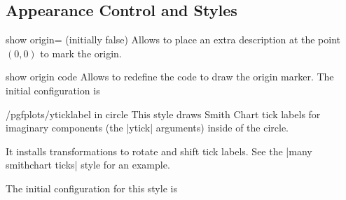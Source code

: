 \subsection{Appearance Control and Styles}
\begin{pgfplotskey}{show origin= (initially false)}
	Allows to place an extra description at the point $(0,0)$ to mark the origin.
\begin{codeexample}[]
\end{codeexample}
\begin{pgfplotscodekey}{show origin code}
	Allows to redefine the code to draw the origin marker. The initial configuration is
\begin{codeexample}
\end{codeexample}
\end{pgfplotscodekey}
\end{pgfplotskey}

\begin{stylekey}{/pgfplots/yticklabel in circle}
	This style draws Smith Chart tick labels for imaginary components (the |ytick| arguments) inside of the circle.

	It installs transformations to rotate and shift tick labels. See the |many smithchart ticks| style for an example.

	The initial configuration for this style is
\begin{codeexample}
\end{codeexample}
\end{stylekey}

